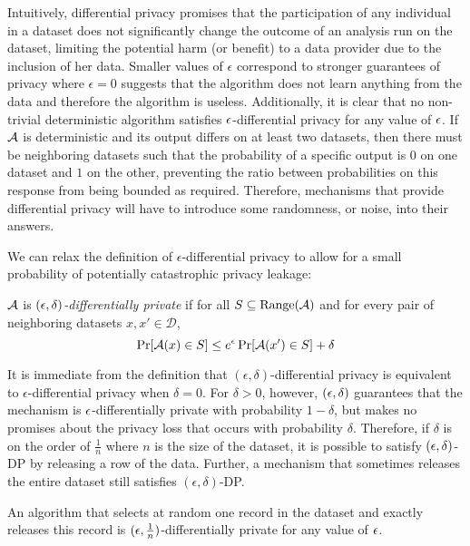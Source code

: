 Intuitively, differential privacy promises that the participation of any individual in a dataset does not significantly change the outcome of an analysis run on the dataset, limiting the potential harm (or benefit) to a data provider due to the inclusion of her data. Smaller values of $\epsilon$ correspond to stronger guarantees of privacy where $\epsilon = 0$ suggests that the algorithm does not learn anything from the data and therefore the algorithm is useless. Additionally, it is clear that no non-trivial deterministic algorithm satisfies $\epsilon$-differential privacy for any value of $\epsilon$. If $\mathcal{A}$ is deterministic and its output differs on at least two datasets, then there must be neighboring datasets such that the probability of a specific output is $0$ on one dataset and $1$ on the other, preventing the ratio between probabilities on this response from being bounded as required. Therefore, mechanisms that provide differential privacy will have to introduce some randomness, or noise, into their answers.

We can relax the definition of $\epsilon$-differential privacy to allow for a small probability of potentially catastrophic privacy leakage:

\begin{definition}
$\mathcal{A}$ is \emph{$(\epsilon, \delta)$-differentially private} if for all $S \subseteq \text{Range}(\mathcal{A})$ and for every pair of neighboring datasets $x, x' \in \mathcal{D}$,
\begin{equation*}
\Pr[\mathcal{A}(x) \in S] \leq e^{\epsilon} \Pr[\mathcal{A}(x') \in S] + \delta
\end{equation*}
\end{definition}

It is immediate from the definition that $(\epsilon, \delta)$-differential privacy is equivalent to $\epsilon$-differential privacy  when $\delta = 0$. For $\delta > 0$,  however, $(\epsilon, \delta)$ guarantees that the mechanism is $\epsilon$-differentially private with probability $1-\delta$, but makes no promises about the privacy loss that occurs with probability $\delta$. Therefore, if $\delta$ is on the order of $\frac{1}{n}$ where $n$ is the size of the dataset, it is possible to satisfy $(\epsilon, \delta)$-DP by releasing a row of the data. Further, a mechanism that sometimes releases the entire dataset still satisfies $(\epsilon, \delta)$-DP.

\begin{example}
	An algorithm that selects at random one record in the dataset and exactly releases this record is $(\epsilon, \frac{1}{n})$-differentially private for any value of $\epsilon$.
\end{example}

